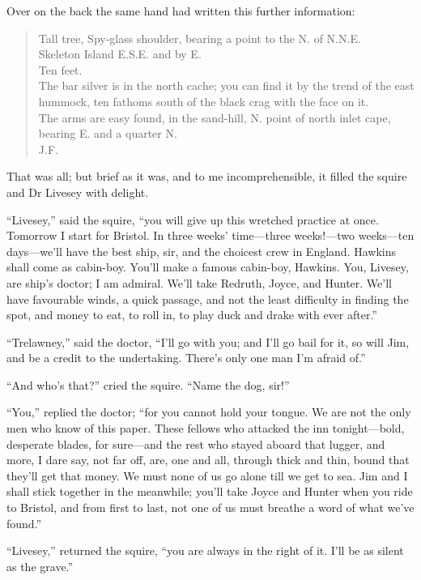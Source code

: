 Over on the back the same hand had written this further information:

\blockquote{
Tall tree, Spy-glass shoulder, bearing a point to the N. of N.N.E.\\
Skeleton Island E.S.E. and by E.\\
Ten feet.\\
The bar silver is in the north cache; you can find it by the trend of the east hummock, ten fathoms south of the black crag with the face on it.\\
The arms are easy found, in the sand-hill, N. point of north inlet cape, bearing E. and a quarter N.\\
\textsc{J.F.}}

That was all; but brief as it was, and to me incomprehensible, it filled the squire and Dr Livesey with delight.

\enquote{Livesey,} said the squire, \enquote{you will give up this wretched practice at once. Tomorrow I start for Bristol. In three weeks’ time---three weeks!---two weeks---ten days---we’ll have the best ship, sir, and the choicest crew in England. Hawkins shall come as cabin-boy. You’ll make a famous cabin-boy, Hawkins. You, Livesey, are ship’s doctor; I am admiral. We’ll take Redruth, Joyce, and Hunter. We’ll have favourable winds, a quick passage, and not the least difficulty in finding the spot, and money to eat, to roll in, to play duck and drake with ever after.}

\enquote{Trelawney,} said the doctor, \enquote{I’ll go with you; and I’ll go bail for it, so will Jim, and be a credit to the undertaking. There’s only one man I’m afraid of.}

\enquote{And who’s that?} cried the squire. \enquote{Name the dog, sir!}

\enquote{You,} replied the doctor; \enquote{for you cannot hold your tongue. We are not the only men who know of this paper. These fellows who attacked the inn tonight---bold, desperate blades, for sure---and the rest who stayed aboard that lugger, and more, I dare say, not far off, are, one and all, through thick and thin, bound that they’ll get that money. We must none of us go alone till we get to sea. Jim and I shall stick together in the meanwhile; you’ll take Joyce and Hunter when you ride to Bristol, and from first to last, not one of us must breathe a word of what we’ve found.}

\enquote{Livesey,} returned the squire, \enquote{you are always in the right of it. I’ll be as silent as the grave.}
